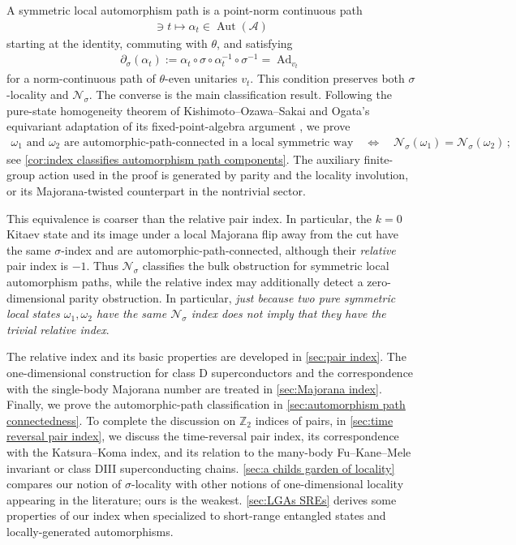 \documentclass[a4paper,10pt]{article}
\numberwithin{equation}{section}
\theoremstyle{plain}
\theoremstyle{plain}
\theoremstyle{plain}
\theoremstyle{plain}
\theoremstyle{plain}
\theoremstyle{remark}
\theoremstyle{definition}
\newcommand{\ZZ}{\mathbb{Z}}
\newcommand{\calA}{\mathcal{A}}
\newcommand{\calN}{\mathcal{N}}
\newcommand{\Automorphisms}[1]{\operatorname{Aut}(#1)}
\newcommand{\Ad}[1]{\operatorname{Ad}_{#1}}
\newcommand{\eq}[1]{\begin{align*}#1\end{align*}}
\begin{document}
A symmetric local automorphism path is a point-norm continuous path
\eq{
    [0,1]\ni t
    \longmapsto
    \alpha_t\in\Automorphisms{\calA}
}
starting at the identity, commuting with $\theta$, and satisfying
\eq{
    \partial_\sigma(\alpha_t)
    :=
    \alpha_t\circ\sigma\circ\alpha_t^{-1}\circ\sigma^{-1}
    =
    \Ad{v_t}
}
for a norm-continuous path of $\theta$-even unitaries $v_t$. This condition preserves both $\sigma$-locality and $\calN_\sigma$. The converse is the main classification result. Following the pure-state homogeneity theorem of Kishimoto--Ozawa--Sakai \cite{KishimotoOzawaSakai2003Homogeneity} and Ogata's equivariant adaptation of its fixed-point-algebra argument \cite{Ogata2021PureStates}, we prove
\eq{
    \omega_1
    \text{ and }
    \omega_2
    \text{ are }
    \text{automorphic-path-connected in a local symmetric way}
    \quad\Longleftrightarrow\quad
    \calN_\sigma(\omega_1)
    =
    \calN_\sigma(\omega_2)\,;
}
see \cref{cor:index classifies automorphism path components}. The auxiliary finite-group action used in the proof is generated by parity and the locality involution, or its Majorana-twisted counterpart in the nontrivial sector.

This equivalence is coarser than the relative pair index. In particular, the $k=0$ Kitaev state and its image under a local Majorana flip away from the cut have the same $\sigma$-index and are automorphic-path-connected, although their \emph{relative} pair index is $-1$. Thus $\calN_\sigma$ classifies the bulk obstruction for symmetric local automorphism paths, while the relative index may additionally detect a zero-dimensional parity obstruction. In particular, \emph{just because two pure symmetric local states $\omega_1,\omega_2$ have the same $\calN_\sigma$ index does not imply that they have the trivial relative index}.

The relative index and its basic properties are developed in
\cref{sec:pair index}. The one-dimensional construction for class D superconductors and the
correspondence with the single-body Majorana number are treated in
\cref{sec:Majorana index}. Finally, we prove the
automorphic-path classification in
\cref{sec:automorphism path connectedness}. To complete the discussion on $\ZZ_2$ indices of pairs, in \cref{sec:time reversal pair index}, we discuss the time-reversal pair index, its correspondence with the Katsura--Koma index, and its relation to the many-body Fu--Kane--Mele invariant or class DIII superconducting chains. \cref{sec:a childs garden of locality} compares our notion of $\sigma$-locality with other notions of one-dimensional locality appearing in the literature; ours is the weakest. \cref{sec:LGAs SREs} derives some properties of our index when specialized to short-range entangled states and locally-generated automorphisms.
\end{document}
